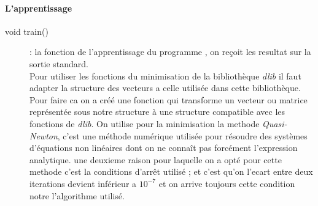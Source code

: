 \paragraph{L'apprentissage}
\begin{description}
\item[{void train()}]: la fonction de l'apprentissage du programme , on reçoit les resultat sur la sortie standard.\\
Pour utiliser les fonctions du minimisation de la bibliothèque \textit{dlib} il faut adapter la structure des vecteurs a celle utilisée dans cette bibliothèque.
Pour faire ca on a créé une fonction qui transforme un vecteur ou matrice représentée sous notre structure à une structure compatible avec les fonctions de \textit{dlib}.
On utilise pour la minimisation la methode \textit{Quasi-Newton}, c'est une méthode numérique utilisée pour résoudre des systèmes d'équations non linéaires dont on ne connaît pas forcément l'expression analytique.
une deuxieme raison pour laquelle on a opté pour cette methode c'est la conditions d'arrêt  utilisé ; et c'est qu'on l'ecart entre deux iterations devient inférieur a $10^{-7}$ et on arrive toujours cette condition notre l'algorithme utilisé.


\begin{verbatim}

\end{verbatim}
\end{description}
